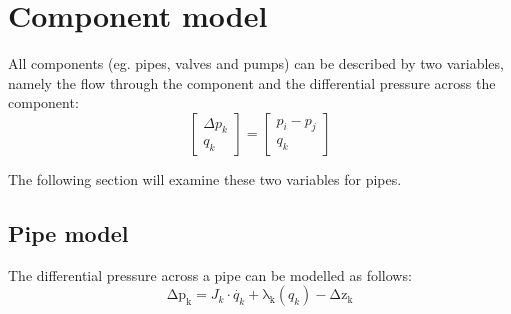 \section{Component model}
All components (eg. pipes, valves and pumps) can be described by two variables, namely the flow through the component and the differential pressure across the component:\newline
\begin{equation}
\begin{bmatrix} \Delta{p_{k}} \\ q_{k} \end{bmatrix} = 
\begin{bmatrix} p_{i} - p_{j} \\ q_{k} \end{bmatrix}    
\end{equation}

The following section will examine these two variables for pipes.

\subsection{Pipe model}
The differential pressure across a pipe can be modelled as follows:
\begin{equation}
    \mathrm{\Delta{p_{k}}} = J_{k}\cdot\dot{q_{k}}+\mathrm{\lambda_{k}}(q_{k})-\mathrm{\Delta{z_{k}}}
\end{equation}